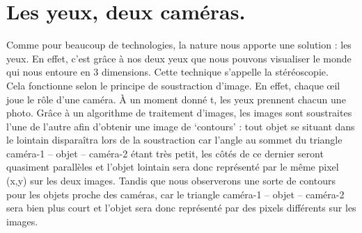 \documentclass[a4paper,10pt]{report}
\begin{document}
\section{Les yeux, deux caméras.}
Comme pour beaucoup de technologies, la nature nous apporte une solution : les yeux. En effet, c’est grâce à nos deux yeux que nous pouvons visualiser le monde qui nous entoure en 3 dimensions. Cette technique s’appelle la stéréoscopie.\cite{stereo,raspberry}
\\
Cela fonctionne selon le principe de soustraction d’image. En effet, chaque œil joue le rôle d’une caméra. À un moment donné t, les yeux prennent chacun une photo. Grâce à un algorithme de traitement d’images, les images sont soustraites l’une de l’autre afin d’obtenir une image de ‘contours’ : tout objet se situant dans le lointain disparaîtra lors de la soustraction car l'angle au sommet du triangle caméra-1 – objet – caméra-2 étant très petit, les côtés de ce dernier seront quasiment parallèles et l'objet lointain sera donc représenté par le même pixel (x,y) sur les deux images. Tandis que nous observerons une sorte de contours pour les objets proche des caméras, car le triangle caméra-1 – objet – caméra-2 sera bien plus court et l'objet sera donc représenté par des pixels différents sur les images.

\end{document}
